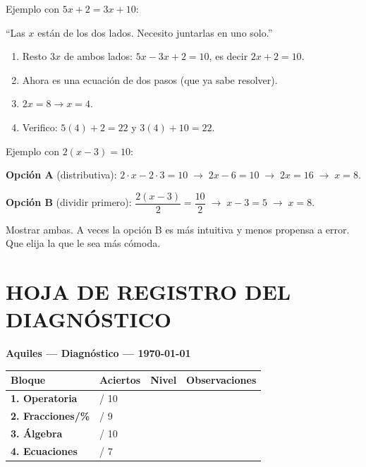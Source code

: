 \documentclass[11pt,a4paper]{article}
\begin{document}
\begin{tcolorbox}[guia-tutor, title={\color{tutormorado} SI NO PUEDE JUNTAR $x$ DE AMBOS LADOS}]
Ejemplo con $5x + 2 = 3x + 10$:

``Las $x$ están de los dos lados. Necesito juntarlas en uno solo.''
\begin{enumerate}[nosep]
  \item Resto $3x$ de ambos lados: $5x - 3x + 2 = 10$, es decir $2x + 2 = 10$.
  \item Ahora es una ecuación de dos pasos (que ya sabe resolver).
  \item $2x = 8 \to x = 4$.
  \item Verifico: $5(4) + 2 = 22$ y $3(4) + 10 = 22$. \checkmark
\end{enumerate}
\end{tcolorbox}

\begin{tcolorbox}[guia-tutor, title={\color{tutormorado} SI NO MANEJA LA DISTRIBUTIVA EN ECUACIONES}]
Ejemplo con $2(x - 3) = 10$:

\textbf{Opción A} (distributiva): $2 \cdot x - 2 \cdot 3 = 10 \;\to\; 2x - 6 = 10 \;\to\; 2x = 16 \;\to\; x = 8$.

\textbf{Opción B} (dividir primero): $\dfrac{2(x-3)}{2} = \dfrac{10}{2} \;\to\; x - 3 = 5 \;\to\; x = 8$.

Mostrar ambas. A veces la opción B es más intuitiva y menos propensa a error. Que elija la que le sea más cómoda.
\end{tcolorbox}

\newpage

\section*{HOJA DE REGISTRO DEL DIAGNÓSTICO}

\begin{center}
{\large\bfseries\color{azuloscuro} Aquiles --- Diagnóstico --- \today}
\end{center}

\medskip

\begin{tabular}{@{}>{\bfseries}p{3.5cm} p{1.8cm} p{2cm} p{6cm}@{}}
\toprule
\textbf{Bloque} & \textbf{Aciertos} & \textbf{Nivel} & \textbf{Observaciones} \\
\midrule
1. Operatoria    & \quad / 10 & & \rule{0pt}{1.5cm} \\[1.5cm]
\midrule
2. Fracciones/\% & \quad / 9  & & \rule{0pt}{1.5cm} \\[1.5cm]
\midrule
3. Álgebra       & \quad / 10 & & \rule{0pt}{1.5cm} \\[1.5cm]
\midrule
4. Ecuaciones    & \quad / 7  & & \rule{0pt}{1.5cm} \\[1.5cm]
\bottomrule
\end{tabular}
\end{document}
